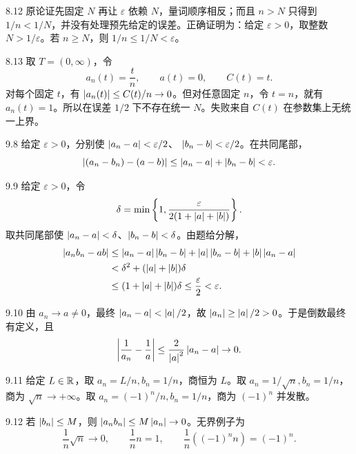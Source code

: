 \begin{solution}{8.12}
原论证先固定 \(N\) 再让 \(\varepsilon\) 依赖 \(N\)，量词顺序相反；而且 \(n>N\) 只得到 \(1/n<1/N\)，并没有处理预先给定的误差。正确证明为：给定 \(\varepsilon>0\)，取整数 \(N>1/\varepsilon\)。若 \(n\ge N\)，则
\(1/n\le1/N<\varepsilon\)。
\end{solution}

\begin{solution}{8.13}
取 \(T=(0,\infty)\)，令
\[
 a_n(t)=\frac tn,\qquad a(t)=0,\qquad C(t)=t.
\]
对每个固定 \(t\)，有 \(\left|a_n(t)\right|\le C(t)/n\to0\)。但对任意固定 \(n\)，令 \(t=n\)，就有 \(a_n(t)=1\)。所以在误差 \(1/2\) 下不存在统一 \(N\)。失败来自 \(C(t)\) 在参数集上无统一上界。
\end{solution}

\begin{solution}{9.8}
给定 \(\varepsilon>0\)，分别使
\(\left|a_n-a\right|<\varepsilon/2\)、
\(\left|b_n-b\right|<\varepsilon/2\)。在共同尾部，
\[
 \left|(a_n-b_n)-(a-b)\right|
 \le\left|a_n-a\right|+\left|b_n-b\right|<\varepsilon.
\]
\end{solution}

\begin{solution}{9.9}
给定 \(\varepsilon>0\)，令
\[
 \delta=\min\left\{1,\frac{\varepsilon}{2(1+\left|a\right|+\left|b\right|)}\right\}.
\]
取共同尾部使
\(\left|a_n-a\right|<\delta\)、\(\left|b_n-b\right|<\delta\)。由题给分解，
\[
\begin{aligned}
 \left|a_nb_n-ab\right|
 &\le \left|a_n-a\right|\left|b_n-b\right|
   +\left|a\right|\left|b_n-b\right|
   +\left|b\right|\left|a_n-a\right|\\
 &<\delta^2+(\left|a\right|+\left|b\right|)\delta\\
 &\le(1+\left|a\right|+\left|b\right|)\delta\le\frac{\varepsilon}{2}<\varepsilon.
\end{aligned}
\]
\end{solution}

\begin{solution}{9.10}
由 \(a_n\to a\ne0\)，最终
\(\left|a_n-a\right|<\left|a\right|/2\)，故
\(\left|a_n\right|\ge\left|a\right|/2>0\)。于是倒数最终有定义，且
\[
 \left|\frac1{a_n}-\frac1a\right|
 \le\frac{2}{\left|a\right|^2}\left|a_n-a\right|\to0.
\]
\end{solution}

\begin{solution}{9.11}
给定 \(L\in\mathbb{R}\)，取 \(a_n=L/n,b_n=1/n\)，商恒为 \(L\)。取
\(a_n=1/\sqrt n,b_n=1/n\)，商为 \(\sqrt n\to+\infty\)。取
\(a_n=(-1)^n/n,b_n=1/n\)，商为 \((-1)^n\) 并发散。
\end{solution}

\begin{solution}{9.12}
若 \(\left|b_n\right|\le M\)，则
\(\left|a_nb_n\right|\le M\left|a_n\right|\to0\)。无界例子为
\[
 \frac1n\sqrt n\to0,\qquad
 \frac1n n=1,\qquad
 \frac1n((-1)^nn)=(-1)^n.
\]
\end{solution}

